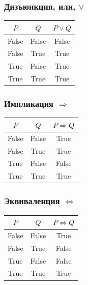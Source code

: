 \begin{frame}
	\Large
	\frametitle{Дизъюнкция, или, $∨$}
	\begin{center}
	\begin{table}
		\begin{tabular}{|c|c|c|}
			\hline
			\rowcolor{darkBlue}
			$P$ & 		$Q$ &		 $P ∨ Q$ \\ \hline
			False & 	False & 	False \\ \hline
			False & 	True & 		True \\ \hline
			True  & 	False & 	True \\ \hline
			True & 		True & 		True \\ \hline
		\end{tabular}
	\end{table}
	\end{center}
\end{frame}

\begin{frame}
	\Large
	\frametitle{Импликация $\Rightarrow$}
	\begin{center}
	\begin{table}
		\begin{tabular}{|c|c|c|}
			\hline
			\rowcolor{darkBlue}
			$P$ & 		$Q$ &		 $P \Rightarrow Q$ \\ \hline
			False & 	False & 	True \\ \hline
			False & 	True & 		True \\ \hline
			True  & 	False & 	False \\ \hline
			True & 		True & 		True \\ \hline
		\end{tabular}
	\end{table}
	\end{center}
\end{frame}

\begin{frame}
	\Large
	\frametitle{Эквиваленция $\Leftrightarrow$}
	\begin{center}
		\begin{tabular}{|c|c|c|}
			\hline
			\rowcolor{darkBlue}
			$P$ & 		$Q$ &		 $P \Leftrightarrow Q$ \\ \hline
			False & 	False & 	True \\ \hline
			False & 	True & 		False \\ \hline
			True  & 	False & 	False \\ \hline
			True & 		True & 		True \\ \hline
		\end{tabular}
	\end{center}
\end{frame}


